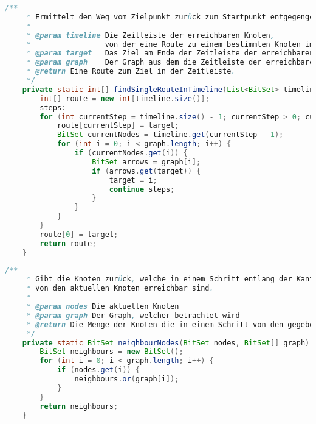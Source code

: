 \documentclass[a4paper,10pt,ngerman]{scrartcl}
\begin{document}
	
	\begin{lstlisting}[frame=single,language=Java,title=Methode findSingleRouteInTimeline,breaklines=true]
    /**
     * Ermittelt den Weg vom Zielpunkt zurück zum Startpunkt entgegengesetzt der Kantenrichtung des Graphen.
     *
     * @param timeline Die Zeitleiste der erreichbaren Knoten,
     *                 von der eine Route zu einem bestimmten Knoten im letzten Zeitpunkt der Zeitleiste gebaut werden soll.
     * @param target   Das Ziel am Ende der Zeitleiste der erreichbaren Knoten, zudem eine Route gebaut werden soll.
     * @param graph    Der Graph aus dem die Zeitleiste der erreichbaren Knoten (und dementsprechend auch das Ziel) stammt.
     * @return Eine Route zum Ziel in der Zeitleiste.
     */
    private static int[] findSingleRouteInTimeline(List<BitSet> timeline, int target, BitSet[] graph) {
        int[] route = new int[timeline.size()];
        steps:
        for (int currentStep = timeline.size() - 1; currentStep > 0; currentStep--) {
            route[currentStep] = target;
            BitSet currentNodes = timeline.get(currentStep - 1);
            for (int i = 0; i < graph.length; i++) {
                if (currentNodes.get(i)) {
                    BitSet arrows = graph[i];
                    if (arrows.get(target)) {
                        target = i;
                        continue steps;
                    }
                }
            }
        }
        route[0] = target;
        return route;
    }
	\end{lstlisting}
	
	
	\begin{lstlisting}[frame=single,language=Java,title=Methode neighbourNodes,breaklines=true]
    /**
     * Gibt die Knoten zurück, welche in einem Schritt entlang der Kantenrichtung,
     * von den aktuellen Knoten erreichbar sind.
     *
     * @param nodes Die aktuellen Knoten
     * @param graph Der Graph, welcher betrachtet wird
     * @return Die Menge der Knoten die in einem Schritt von den gegebenen Knoten erreichbar ist
     */
    private static BitSet neighbourNodes(BitSet nodes, BitSet[] graph) {
        BitSet neighbours = new BitSet();
        for (int i = 0; i < graph.length; i++) {
            if (nodes.get(i)) {
                neighbours.or(graph[i]);
            }
        }
        return neighbours;
    }
	\end{lstlisting}
	
\end{document}
